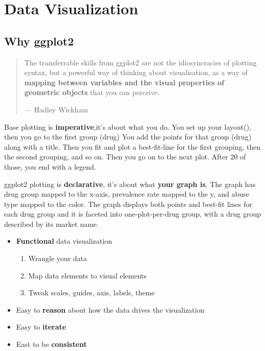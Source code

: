 \documentclass[]{book}
\providecommand{\tightlist}{%
  \setlength{\itemsep}{0pt}\setlength{\parskip}{0pt}}
\theoremstyle{definition}
\theoremstyle{definition}
\theoremstyle{definition}
\theoremstyle{remark}
\begin{document}
\hypertarget{data-visualization}{%
\chapter{Data Visualization}\label{data-visualization}}

\hypertarget{why-ggplot2}{%
\section{Why ggplot2}\label{why-ggplot2}}

\begin{quote}
The transferrable skills from ggplot2 are not the idiosyncracies of
plotting syntax, but a powerful way of thinking about visualisation, as
a way of \textbf{mapping between variables and the visual properties of
geometric objects} that you can perceive.

--- Hadley Wickham
\end{quote}

Base plotting is \textbf{imperative},it's about what you do. You set up
your layout(), then you go to the first group (drug) You add the points
for that group (drug) along with a title. Then you fit and plot a
best-fit-line for the first grouping, then the second grouping, and so
on. Then you go on to the next plot. After 20 of those, you end with a
legend.

ggplot2 plotting is \textbf{declarative}, it's about what \textbf{your
graph is}. The graph has drug group mapped to the x-axis, prevalence
rate mapped to the y, and abuse type mapped to the color. The graph
displays both points and best-fit lines for each drug group and it is
faceted into one-plot-per-drug group, with a drug group described by its
market name.

\begin{itemize}
\tightlist
\item
  \textbf{Functional} data visualization

  \begin{enumerate}
  \def\labelenumi{\arabic{enumi}.}
  \tightlist
  \item
    Wrangle your data
  \item
    Map data elements to visual elements
  \item
    Tweak scales, guides, axis, labels, theme
  \end{enumerate}
\item
  Easy to \textbf{reason} about how the data drives the visualization
\item
  Easy to \textbf{iterate}
\item
  East to be \textbf{consistent}
\end{itemize}
\end{document}
